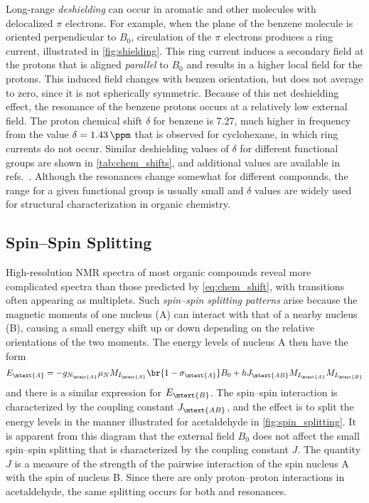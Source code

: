 Long-range \emph{deshielding} can occur in aromatic and other molecules with delocalized \( \pi \) electrons. 
For example, when the plane of the benzene molecule is oriented perpendicular to \( B_0 \), circulation of the \( \pi \) electrons produces a ring current, illustrated in \cref{fig:shielding}. 
This ring current induces a secondary field at the protons that is aligned \emph{parallel} to \( B_0 \) and results in a higher local field for the protons. 
This induced field changes with benzen orientation, but does not average to zero, since it is not spherically symmetric. 
Because of this net deshielding effect, the resonance of the benzene protons occurs at a relatively low external field. 
The proton chemical shift \( \delta  \) for benzene is \SI{7.27}{\ppm}, much higher in frequency from the value \( \delta = \SI{1.43}{\ppm} \) that is observed for cyclohexane, in which ring currents do not occur. 
Similar deshielding values of \( \delta \) for different functional groups are shown in \cref{tab:chem_shifts}, and additional values are available in refs.~\autocite{davis1965advanced,pople1959nmr,silverstein2005spec,sdbs2020,aldrich1993nmr}.
Although the resonances change somewhat for different compounds, the range for a given functional group is usually small and \( \delta \) values are widely used for structural characterization in organic chemistry. 



\subsection{Spin--Spin Splitting} %
\label{sub:spin_spin_splitting}

High-resolution NMR spectra of most organic compounds reveal more complicated spectra than those predicted by \cref{eq:chem_shift}, with transitions often appearing as multiplets.
Such \emph{spin--spin splitting patterns} arise because the magnetic moments of one nucleus (A) can interact with that of a nearby nucleus (B), causing a small energy shift up or down depending on the relative orientations of the two moments. 
The energy levels of nucleus A then have the form 
\begin{equation}
	E_\mtext{A} = -g_{N_\mtext{A}} \mu_N M_{I_\mtext{A}} \br{1-\sigma_\mtext{A}} B_0
		+ h J_\mtext{AB} M_{I_\mtext{A}} M_{I_\mtext{B}}
	\label{eq:j_coupling}
\end{equation}
and there is a similar expression for \( E_\mtext{B} \). 
The spin--spin interaction is characterized by the coupling constant \( J_\mtext{AB} \), and the effect is to split the energy levels in the manner illustrated for acetaldehyde in \cref{fig:spin_splitting}. 
It is apparent from this diagram that the external field \( B_0 \) does not affect the small spin--spin splitting that is characterized by the coupling constant \( J \). 
The quantity \( J \) is a measure of the strength of the pairwise interaction of the spin nucleus A with the spin of nucleus B. 
Since there are only proton--proton interactions in acetaldehyde, the same splitting occurs for both  and  resonances. 

